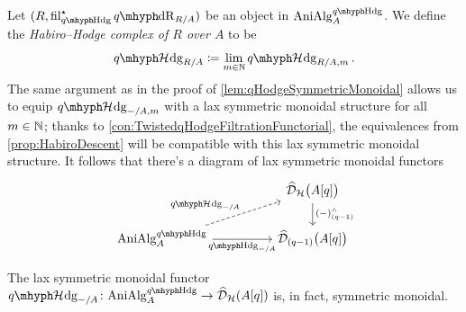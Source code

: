 \documentclass[DIV=12,numbers=enddot,leqno,bibliography=totoc]{scrartcl}
\begin{document}
	\begin{numpar}\label{con:HabiroDescent}
		Let $(R, \fil_{\qHodge}^\star \qdeRham_{R/A})$ be an object in $\cat{AniAlg}_A^{\qHodge}$. We define the \emph{Habiro--Hodge complex of $R$ over $A$} to be
		\begin{equation*}
			\qHhodge_{R/A}\coloneqq \limit_{m\in\IN}\qHhodge_{R/A,  m}\,.
		\end{equation*}
		The same argument as in the proof of \cref{lem:qHodgeSymmetricMonoidal} allows us to equip $\qHhodge_{-/A,  m}$ with a lax symmetric monoidal structure for all $m\in\mathbb{N}$; thanks to \cref{con:TwistedqHodgeFiltrationFunctorial}, the equivalences from \cref{prop:HabiroDescent} will be compatible with this lax symmetric monoidal structure. It follows that there's a diagram of lax symmetric monoidal functors
		\begin{equation*}
			\begin{tikzcd}[column sep=huge]
				& \widehat{\Dd}_\Hh\bigl(A[q]\bigr)\dar["(-)_{(q-1)}^\complete"]\\
				\cat{AniAlg}_A^{\qHodge}\rar["\qHodge_{-/A}"']\urar[dashed,"\qHhodge_{-/A}"] & \widehat{\Dd}_{(q-1)}\bigl(A[q]\bigr)
			\end{tikzcd}
		\end{equation*}
	\end{numpar}
	\begin{lem}\label{lem:HabiroDescentSymmetricMonoidal}
		The lax symmetric monoidal functor $\qHhodge_{-/A}\colon \cat{AniAlg}_A^{\qHodge}\rightarrow \widehat{\Dd}_\Hh(A[q])$ is, in fact, symmetric monoidal.
	\end{lem}
\end{document}
